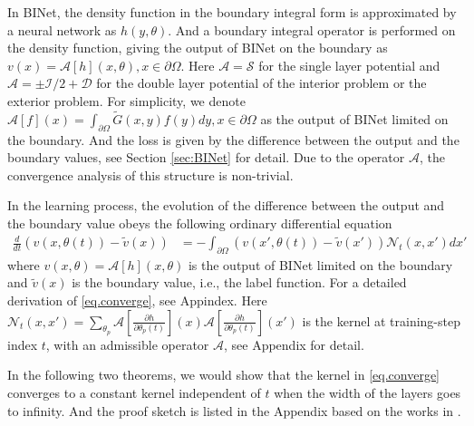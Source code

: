 \documentclass[hyperref]{article}
\numberwithin{equation}{section}
\theoremstyle{nonumberplain}
\begin{document}
	In BINet, the density function in the boundary integral form is approximated by a neural network as $h(y,\theta)$. And a boundary integral operator is performed on the density function, giving the output of BINet on the boundary as $v(x) =\mathcal{A}[h](x,\theta), x\in\partial\Omega$. Here $\mathcal{A}=\mathcal{S}$ for the single layer potential and $\mathcal{A}=\pm \mathcal{I}/2 +\mathcal{D}$ for the double layer potential of the interior problem or the exterior problem. For simplicity, we denote $\mathcal{A}[f](x) = \int_{\partial\Omega}\tilde{G}(x,y)f(y)dy, x\in\partial\Omega$ as the output of BINet limited on the boundary. And the loss is given by the difference between the output and the boundary values, see Section \ref{sec:BINet} for detail. Due to the operator $\mathcal{A}$, the convergence analysis of this structure is non-trivial. 
	
	In the learning process, the evolution of the difference between the output and the boundary value obeys the following ordinary differential equation
	\begin{equation}\label{eq.converge}
		\begin{split}
			\frac{d}{dt}(v(x,\theta(t))-\tilde{v}(x)) & = %
			-\int_{\partial\Omega} (v(x',\theta(t))-\tilde{v}(x')) \mathcal{N}_t(x,x')dx'
		\end{split}
	\end{equation}
	where $v(x,\theta) = \mathcal{A}[h](x,\theta)$ is the output of BINet limited on the boundary and $\tilde{v}(x)$ is the boundary value, i.e., the label function. For a detailed derivation of \eqref{eq.converge}, see Appindex.
	Here $\mathcal{N}_t(x,x')=\sum_{\theta_p}\mathcal{A}[\frac{\partial h}{\partial \theta_p(t)}](x)\mathcal{A}[\frac{\partial h}{\partial \theta_p(t)}](x')$ is the kernel at training-step index $t$, with an admissible operator $\mathcal{A}$, see Appendix for detail.
	
	In the following two theorems, we would show that the kernel in \eqref{eq.converge} converges to a constant kernel independent of $t$ when the width of the layers goes to infinity. And the proof sketch is listed in the Appendix based on the works in \cite{arora2019exact}.
	
\end{document}
